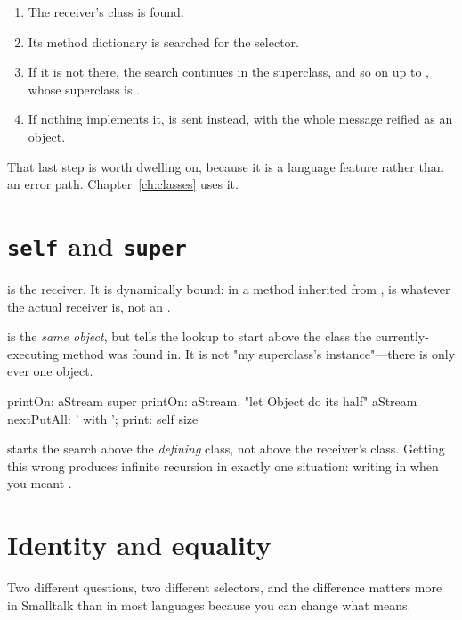\begin{enumerate}
\item The receiver's class is found.
\item Its method dictionary is searched for the selector.
\item If it is not there, the search continues in the superclass, and so on up
  to , whose superclass is .
\item If nothing implements it,  is sent instead, with
  the whole message reified as an object.
\end{enumerate}

That last step is worth dwelling on, because it is a language feature rather
than an error path. Chapter~\ref{ch:classes} uses it.

\section{\texttt{self} and \texttt{super}}

 is the receiver. It is dynamically bound: in a method inherited from
,  is whatever the actual receiver is, not an
.

 is the \emph{same object}, but tells the lookup to start above the
class the currently-executing method was found in. It is not "my superclass's
instance"---there is only ever one object.

\begin{st}
printOn: aStream
    super printOn: aStream.          "let Object do its half"
    aStream nextPutAll: ' with '; print: self size
\end{st}

\begin{stwarn}
 starts the search above the \emph{defining} class, not above the
receiver's class. Getting this wrong produces infinite recursion in exactly
one situation: writing  in  when you meant
.
\end{stwarn}

\section{Identity and equality}

Two different questions, two different selectors, and the difference matters
more in Smalltalk than in most languages because you can change what \ct{=}
means.


